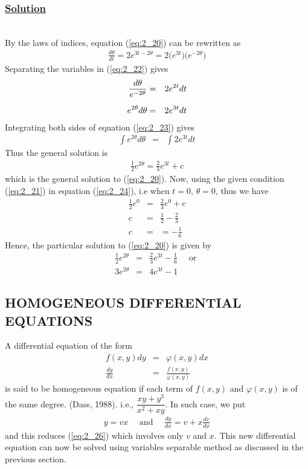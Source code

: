 \documentclass[11pt]{report}
\newcommand{\ubt}[1]{\textbf{\underline{#1}}}
\newcommand{\sps}{\\[0.2cm]}
\newcommand{\spn}[1]{\\[#1cm]}
\newcommand{\refn}[1]{(\ref{#1})}
\newcommand{\refx}[1]{\refn{eq:#1}}
\newcommand{\solution}{\subsubsection{\ubt{Solution}}{~}\spn{-1}}
\begin{document}
	\solution
	By the laws of indices, equation \refx{2_20} can be rewritten as 
	\begin{eqnarray}
		\frac{d\theta}{dt} = 2e^{3t-2\theta} = 2\big(e^{3t}\big)\big(e^{-2\theta}\big)\label{eq:2_22}
	\end{eqnarray}
	Separating the variables in \refx{2_22} gives
	\begin{eqnarray}
		\frac{d\theta}{e^{-2\theta}} &=& 2e^{2t}dt\notag\sps
		e^{2\theta}d\theta &=&2e^{3t}dt\label{eq:2_23}
	\end{eqnarray}
	Integrating both sides of equation \refx{2_23} gives
	\begin{eqnarray*}
		\int e^{2\theta}d\theta &=&\int 2e^{3t}dt
	\end{eqnarray*}
	Thus the general solution is
	\begin{eqnarray}
		\frac{1}{2}e^{2\theta} = \frac{2}{3}e^{3t} + c\label{eq:2_24}
	\end{eqnarray}
	which is the general solution to \refx{2_20}. Now, using the given condition \refx{2_21} in equation \refx{2_24}, i.e when $t=0$, $\theta=0$, thus we have
	\begin{eqnarray*}
		\frac{1}{2}e^{0} &=& \frac{2}{3}e^{0} + c\sps
		c &=& \frac{1}{2} - \frac{2}{3}\sps
		c & =& = -\frac{1}{6}
	\end{eqnarray*}
	Hence, the particular solution to \refx{2_20} is given by
	\begin{eqnarray*}
		\frac{1}{2}e^{2\theta} &=& \frac{2}{3}e^{3t} - \frac{1}{6} \quad \text{ or } \sps
		3e^{2\theta} &=&4e^{3t} - 1
	\end{eqnarray*}
	
	\subsection{HOMOGENEOUS DIFFERENTIAL EQUATIONS}
	A differential equation of the form
	\begin{eqnarray}
		f(x,y)dy &=& \varphi(x,y)dx\\
		\frac{dy}{dx} &=& \frac{f(x,y)}{\varphi(x,y)}\label{eq:2_26}
	\end{eqnarray}
	is said to be homogeneous equation if each term of $f(x,y)$ and $\varphi(x,y)$ is of the same degree. (Dass, 1988). i.e., $\dfrac{xy + y^3}{x^2 + xy}$. In such case, we put
	\begin{eqnarray}
		y = vx \quad\text{ and }\quad \frac{dy}{dx} = v + x\frac{dv}{dx}
	\end{eqnarray}
	and this reduces \refx{2_26} which involves only $v$ and $x$. This new differential equation can now be solved using variables separable method as discussed in the previous section.
	
\end{document}
